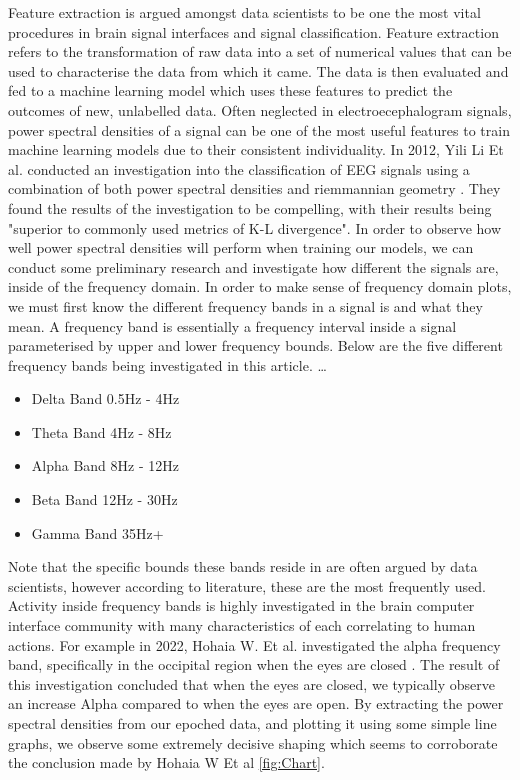 \documentclass[11pt]{article}
\begin{document}
Feature extraction is argued amongst data scientists to be one the most vital procedures in brain signal interfaces and signal classification. Feature extraction refers to the transformation of raw data into a set of numerical values that can be used to characterise the data from which it came. The data is then evaluated and fed to a machine learning model which uses these features to predict the outcomes of new, unlabelled data. Often neglected in electroecephalogram signals, power spectral densities of a signal can be one of the most useful features to train machine learning models due to their consistent individuality. In 2012, Yili Li Et al. conducted an investigation into the classification of EEG signals using a combination of both power spectral densities and riemmannian geometry \cite{features}. They found the results of the investigation to be compelling, with their results being "superior to commonly used metrics of K-L divergence". In order to observe how well power spectral densities will perform when training our models, we can conduct some preliminary research and investigate how different the signals are, inside of the frequency domain. In order to make sense of frequency domain plots, we must first know the different frequency bands in a signal is and what they mean. A frequency band is essentially a frequency interval inside a signal parameterised by upper and lower frequency bounds. Below are the five different frequency bands being investigated in this article. 
\dots
\begin{itemize}
\item Delta Band 0.5Hz - 4Hz
\item Theta Band 4Hz - 8Hz
\item Alpha Band 8Hz - 12Hz
\item Beta Band 12Hz - 30Hz
\item Gamma Band 35Hz+
\end{itemize}

	Note that the specific bounds these bands reside in are often argued by data scientists, however according to literature, these are the most frequently used. Activity inside frequency bands is highly investigated in the brain computer interface community with many characteristics of each correlating to human actions. For example in 2022, Hohaia W. Et al. investigated the alpha frequency band, specifically in the occipital region when the eyes are closed \cite{city27825}. The result of this investigation concluded that when the eyes are closed, we typically observe an increase Alpha compared to when the eyes are open. By extracting the power spectral densities from our epoched data, and plotting it using some simple line graphs, we observe some extremely decisive shaping which seems to corroborate the conclusion made by Hohaia W Et al \ref{fig:Chart}. 
\end{document}
